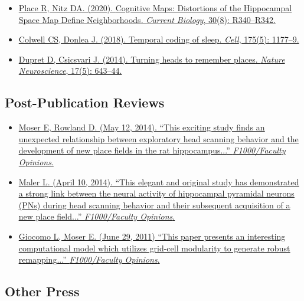 \documentclass[10pt]{article}
\newcommand{\itemtitle}[1]{{\color{hopkinsblue}\ul{#1}}}
\begin{document}
\begin{itemize}
  \item \href{https://dx.doi.org/10.1016/j.cub.2020.02.085}
    {Place R, Nitz DA. (2020). \itemtitle{Cognitive Maps: Distortions of the Hippocampal 
    Space Map Define Neighborhoods}. \emph{Current Biology}, 30(8): R340--R342.}
  \item \href{https://dx.doi.org/10.1016/j.cell.2018.10.047}
    {Colwell CS, Donlea J. (2018). \itemtitle{Temporal coding of sleep}. \emph{Cell}, 175(5): 1177--9.}
  \item \href{https://dx.doi.org/10.1038/nn.3700}
    {Dupret D, Csicsvari J. (2014). \itemtitle{Turning heads to remember
    places}. \emph{Nature Neuroscience}, 17(5): 643--44.}
\end{itemize}

\subsection*{Post-Publication Reviews}

\begin{itemize}
  \item \href{https://facultyopinions.com/prime/718333676#eval793494783}
    {Moser E, Rowland D. (May 12, 2014). ``\itemtitle{This exciting study finds
        an unexpected relationship between exploratory head scanning behavior
      and the development of new place fields in the rat hippocampus...}”
    \emph{F1000/Faculty Opinions}.}
  \item \href{https://facultyopinions.com/prime/718333676#eval793493493}
    {Maler L. (April 10, 2014). ``\itemtitle{This elegant and original study has
        demonstrated a strong link between the neural activity of hippocampal pyramidal
        neurons (PNs) during head scanning behavior and their subsequent acquisition of
    a new place field...}'' \emph{F1000/Faculty Opinions}.}
  \item \href{https://facultyopinions.com/prime/11553956}
    {Giocomo L, Moser E. (June 29, 2011) ``\itemtitle{This paper presents an
        interesting computational model which utilizes grid-cell modularity to generate
    robust remapping...}'' \emph{F1000/Faculty Opinions}.}
\end{itemize}

\subsection*{Other Press}
\end{document}
